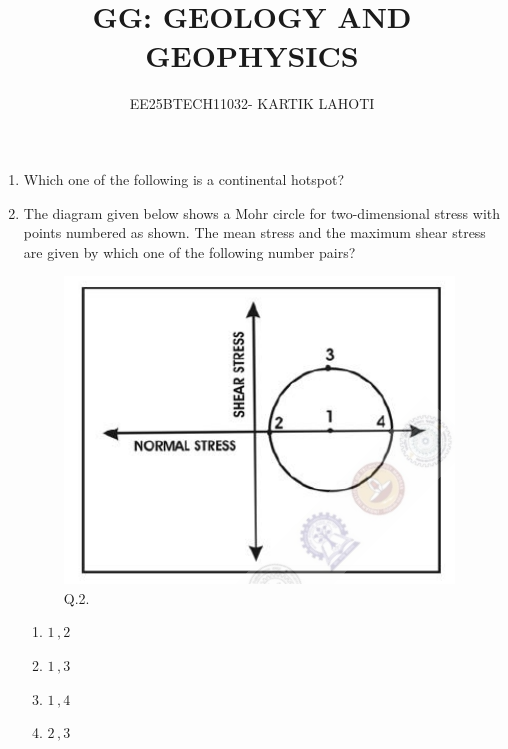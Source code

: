 \documentclass[journal,12pt,onecolumn]{IEEEtran}
\title{GG: GEOLOGY AND GEOPHYSICS}
\author{EE25BTECH11032- KARTIK LAHOTI}
\theoremstyle{remark}
\begin{document}
\maketitle 
\begin{enumerate}


    \item Which one of the following is a continental hotspot? \hfill{}
        \begin{enumerate} 
        \end{enumerate}    
    
    \item The diagram given below shows a Mohr circle for two-dimensional stress with points numbered as shown. The mean stress and the maximum shear stress are given by which one of the following number pairs? \hfill{}
        \begin{figure}[h]
            \centering
            \includegraphics[width=0.3\columnwidth]{Figs/fig_1.png}
            \caption{Q.2.}
            \label{fig:placeholder_1}
        \end{figure}
    
        \begin{enumerate} 
            \item $1\,, 2$
            \item $1\,, 3$
            \item $1\,, 4$
            \item $2\,, 3$
        \end{enumerate}    
    

\end{enumerate}
\end{document}
